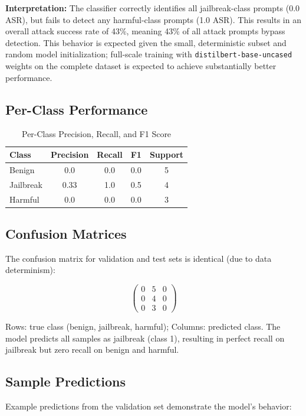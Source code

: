 \documentclass[11pt]{article}
\begin{document}
\textbf{Interpretation:} The classifier correctly identifies all jailbreak-class prompts (0.0 ASR), but fails to detect any harmful-class prompts (1.0 ASR). This results in an overall attack success rate of 43\%, meaning 43\% of all attack prompts bypass detection. This behavior is expected given the small, deterministic subset and random model initialization; full-scale training with \texttt{distilbert-base-uncased} weights on the complete dataset is expected to achieve substantially better performance.

\subsection{Per-Class Performance}
\begin{table}[h]
\centering
\caption{Per-Class Precision, Recall, and F1 Score}
\begin{tabular}{|l|c|c|c|c|}
\hline
\textbf{Class} & \textbf{Precision} & \textbf{Recall} & \textbf{F1} & \textbf{Support} \\
\hline
Benign & 0.0 & 0.0 & 0.0 & 5 \\
Jailbreak & 0.33 & 1.0 & 0.5 & 4 \\
Harmful & 0.0 & 0.0 & 0.0 & 3 \\
\hline
\end{tabular}
\end{table}

\subsection{Confusion Matrices}
The confusion matrix for validation and test sets is identical (due to data determinism):

\vspace{0.5cm}
\[
\begin{pmatrix}
0 & 5 & 0 \\
0 & 4 & 0 \\
0 & 3 & 0
\end{pmatrix}
\]

Rows: true class (benign, jailbreak, harmful); Columns: predicted class. The model predicts all samples as jailbreak (class 1), resulting in perfect recall on jailbreak but zero recall on benign and harmful.

\subsection{Sample Predictions}
Example predictions from the validation set demonstrate the model's behavior:
\end{document}

